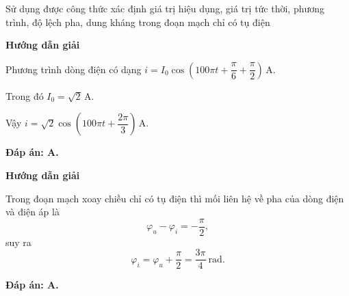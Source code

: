 \begin{dang}{  Sử dụng được công thức xác định giá trị hiệu dụng, giá trị tức thời, phương trình, độ lệch pha, dung kháng trong đoạn mạch chỉ có tụ điện}
	
	{\begin{center}
			\textbf{Hướng dẫn giải}
		\end{center}
		
		Phương trình dòng điện có dạng $i=I_0\cos\left(100\pi t+\dfrac{\pi}{6}+\dfrac{\pi}{2}\right)\,\text{A}$.
		
		Trong đó
		$I_0=\sqrt{2}\,\text{A}$.
		
		Vậy $i=\sqrt{2}\cos\left(100\pi t+\dfrac{2\pi}{3}\right)\,\text{A}$.
		
		
		\textbf{Đáp án: A.}
	}
	{\begin{center}
			\textbf{Hướng dẫn giải}
		\end{center}
		
		
		Trong đoạn mạch xoay chiều chỉ có tụ điện thì mối liên hệ về pha của dòng điện và điện áp là
		\begin{equation*}
			\varphi_u - \varphi_i = -\dfrac{\pi}{2},
		\end{equation*}
		suy ra
		\begin{equation*}
			\varphi_i = \varphi_u + \dfrac{\pi}{2}= \dfrac{3\pi}{4}\ \text {rad}.
		\end{equation*}
		
		\textbf{	Đáp án: A.}
		
		
	}
\end{dang}
